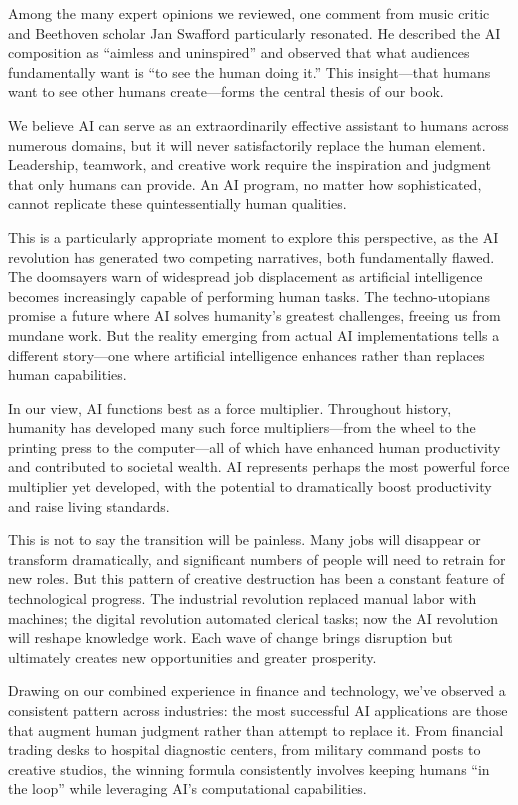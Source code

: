 \documentclass[
  Letterpaper,
]{scrbook}
\begin{document}
Among the many expert opinions we reviewed, one comment from music
critic and Beethoven scholar Jan Swafford particularly resonated. He
described the AI composition as ``aimless and uninspired'' and observed
that what audiences fundamentally want is ``to see the human doing it.''
This insight---that humans want to see other humans create---forms the
central thesis of our book.

We believe AI can serve as an extraordinarily effective assistant to
humans across numerous domains, but it will never satisfactorily replace
the human element. Leadership, teamwork, and creative work require the
inspiration and judgment that only humans can provide. An AI program, no
matter how sophisticated, cannot replicate these quintessentially human
qualities.

This is a particularly appropriate moment to explore this perspective,
as the AI revolution has generated two competing narratives, both
fundamentally flawed. The doomsayers warn of widespread job displacement
as artificial intelligence becomes increasingly capable of performing
human tasks. The techno-utopians promise a future where AI solves
humanity's greatest challenges, freeing us from mundane work. But the
reality emerging from actual AI implementations tells a different
story---one where artificial intelligence enhances rather than replaces
human capabilities.

In our view, AI functions best as a force multiplier. Throughout
history, humanity has developed many such force multipliers---from the
wheel to the printing press to the computer---all of which have enhanced
human productivity and contributed to societal wealth. AI represents
perhaps the most powerful force multiplier yet developed, with the
potential to dramatically boost productivity and raise living standards.

This is not to say the transition will be painless. Many jobs will
disappear or transform dramatically, and significant numbers of people
will need to retrain for new roles. But this pattern of creative
destruction has been a constant feature of technological progress. The
industrial revolution replaced manual labor with machines; the digital
revolution automated clerical tasks; now the AI revolution will reshape
knowledge work. Each wave of change brings disruption but ultimately
creates new opportunities and greater prosperity.

Drawing on our combined experience in finance and technology, we've
observed a consistent pattern across industries: the most successful AI
applications are those that augment human judgment rather than attempt
to replace it. From financial trading desks to hospital diagnostic
centers, from military command posts to creative studios, the winning
formula consistently involves keeping humans ``in the loop'' while
leveraging AI's computational capabilities.
\end{document}
